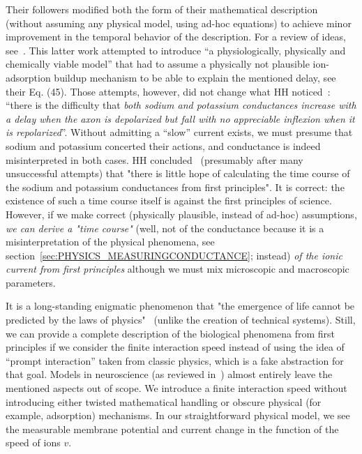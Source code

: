 Their followers modified both the form of their mathematical description
(without assuming any physical model, using ad-hoc equations) to achieve minor improvement in the temporal behavior of the
description. For a review of ideas, see~\cite{Hodgkin-HuxleyAdsorption:2021}.
This latter work attempted to introduce ``a physiologically, physically
and chemically viable model'' that had to assume a physically not
plausible ion-adsorption buildup mechanism to be able to explain the
mentioned delay, see their Eq. (45). Those attempts, however, did
not change what \gls{HH} noticed~\cite{HodgkinHuxley:1952}:
``there is the difficulty that \emph{both sodium and
	potassium conductances increase with a delay when the axon is depolarized
	but fall with no appreciable inflexion when it is repolarized}''.
Without admitting a ``slow'' current exists, we must presume
that sodium and potassium concerted their actions, and conductance
is indeed misinterpreted in both cases. HH concluded~\cite{HodgkinHuxley:1952}
(presumably after many unsuccessful attempts) that "there is little
hope of calculating the time course of the sodium and potassium conductances
from first principles". 
It is correct: the existence of such a time course itself is against the first principles of science.
However, if we make correct (physically
plausible, instead of ad-hoc) assumptions, \textit{we can derive a "time course"} (well, not
of the conductance because it is a misinterpretation of the physical
phenomena, see section~\ref{sec:PHYSICS_MEASURINGCONDUCTANCE}; instead) \textit{of the ionic current from first principles} although
we must mix microscopic and macroscopic parameters. 

It is a long-standing enigmatic phenomenon
that "the emergence of life cannot be predicted by the laws of physics"~\cite{ConservationOfInformation:2021}
(unlike the creation of technical systems).
Still, we can provide
a complete description of the biological phenomena from first principles
if we consider the finite interaction speed instead of using the idea
of ``prompt interaction'' taken from classic physics, which is a
fake abstraction for that goal. Models in neuroscience (as reviewed
in~\cite{BrainNetworkModels:2018}) almost entirely leave the mentioned
aspects out of scope. We introduce a finite interaction speed  without introducing
either twisted mathematical handling or obscure physical (for example,
adsorption) mechanisms. In our straightforward physical model, we see
the measurable membrane potential and current change in the function of
the speed of ions $v$. 


